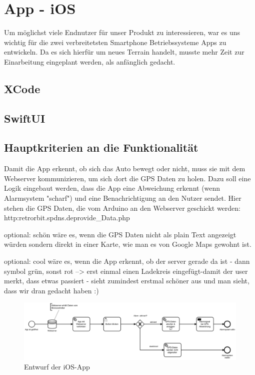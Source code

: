 \section{App - iOS}
Um möglichst viele Endnutzer für unser Produkt zu interessieren, war es uns wichtig für die zwei verbreitetsten Smartphone Betriebssysteme Apps zu entwickeln. Da es sich hierfür um neues Terrain handelt, musste mehr Zeit zur Einarbeitung eingeplant werden, als anfänglich gedacht.

\subsection{XCode}


\subsection{SwiftUI}
\subsection{Hauptkriterien an die Funktionalität}

Damit die App erkennt, ob sich das Auto bewegt oder nicht, muss sie mit dem Webserver kommunizieren, um sich dort die GPS Daten zu holen. Dazu soll eine Logik eingebaut werden, dass die App eine Abweichung erkennt (wenn Alarmsystem "scharf") und eine Benachrichtigung an den Nutzer sendet. Hier stehen die GPS Daten, die vom Arduino  an den Webserver geschickt werden: http:\/\/retrorbit.spdns.de\/provide\_Data.php

optional: schön wäre es, wenn die GPS Daten nicht als plain Text angezeigt würden sondern direkt in einer Karte, wie man es von Google Maps gewohnt ist.

optional: cool wäre es, wenn die App erkennt, ob der server gerade da ist - dann symbol grün, sonst rot 
--> erst einmal einen Ladekreis eingefügt-damit der user merkt, dass etwas passiert - sieht zumindest erstmal schöner aus und man sieht, dass wir dran gedacht haben :)


\begin{figure} [H]
	\begin{center}
		\includegraphics[width=1\textwidth]{Bilder/iOS_camunda.png}
		\caption{Entwurf der iOS-App}
		\label{camunda}
	\end{center}
\end{figure}
